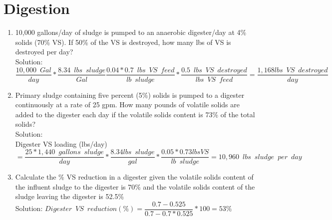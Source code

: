 \section{Digestion}
\begin{enumerate}

\item 10,000 gallons/day of sludge is pumped to an anaerobic digester/day at 4\% solids (70\% VS).  If 50\% of the VS is destroyed, how many lbs of VS is destroyed per day?\\
Solution:\\
$\dfrac{10,000 \enspace Gal}{day}*\dfrac{8.34 \enspace lbs \enspace sludge}{Gal} \dfrac{0.04*0.7 \enspace lbs \enspace VS \enspace feed}{lb \enspace sludge}*\dfrac{0.5 \enspace lbs \enspace VS \enspace destroyed}{lbs \enspace VS \enspace feed}=\boxed{\dfrac{1,168lbs \enspace VS \enspace destroyed}{day} } $


\item Primary sludge containing five percent (5\%) solids is pumped to a digester continuously at a rate of 25 gpm. How many pounds of volatile solids are added to the digester each day if the volatile solids content is 73\% of the total solids?\\
Solution:\\
Digester VS loading (lbs/day)\\$=\dfrac{25*1,440 \enspace gallons \enspace sludge}{day}*\dfrac{8.34lbs \enspace sludge}{gal}*\dfrac{0.05*0.73lbs VS}{lb \enspace sludge}=\boxed{10,960 \enspace lbs \enspace sludge \enspace per \enspace day}$\\


\item Calculate the \% VS reduction in a digester given the volatile solids content of the influent sludge to the digester is 70\% and the volatile solids content of the sludge leaving the digester is 52.5\%\\
Solution:  $Digester \enspace VS \enspace reduction (\%)=\dfrac{0.7-0.525}{0.7-0.7*0.525}*100=\boxed{ 53\%}$\\

\end{enumerate}
